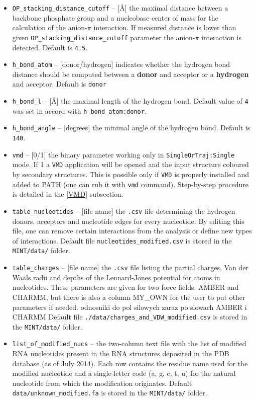 \documentclass[12pt]{article}
\begin{document}
\begin{itemize}
\item \texttt{OP\_stacking\_distance\_cutoff} -- [\AA]  the maximal distance between a backbone phosphate group and a nucleobase center of mass for the calculation of the anion-$\pi$ interaction. If measured distance is lower than given \texttt{OP\_stacking\_distance\_cutoff} parameter the anion-$\pi$ interaction is detected. Default is \texttt{4.5}.
\item \texttt{h\_bond\_atom} -- [donor/hydrogen] indicates whether the hydrogen bond distance should be computed between a \textbf{donor} and acceptor or a \textbf{hydrogen} and acceptor. Default is \texttt{donor} 
\item \texttt{h\_bond\_l} -- [\AA] the maximal length  of the hydrogen bond. Default value of {\tt 4} was set in accord with \texttt{h\_bond\_atom:donor}.
\item \texttt{h\_bond\_angle}  -- [degrees] the minimal angle of the hydrogen bond. Default is {\tt 140}.
\item {\tt vmd} -- [0/1] the binary parameter working only in {\tt SingleOrTraj:Single} mode. If 1 a {\tt VMD} application will be opened and the input structure coloured by secondary structures. This is possible only if {\tt VMD} is properly installed and added to PATH (one can rub it with {\tt vmd} command). Step-by-step procedure is detailed in the \ref{VMD} subsection.
\item \texttt{table\_nucleotides} -- [file name] the {\tt .csv} file determining the hydrogen donors, acceptors and nucleotide edges for every nucleotide. By editing this file, one can remove certain interactions from the analysis or define new types of interactions. Default file \texttt{nucleotides\_modified.csv} is stored in the \texttt{MINT/data/} folder.
\item \texttt{table\_charges}  -- [file name] the \texttt{.csv} file listing the partial charges, Van der Waals radii and depths of the Lennard-Jones potential for atoms in nucleotides. These parameters are given for two force fields: AMBER and CHARMM, but there is also a column MY\_OWN for the user to put other parameters if needed. {\color{red} odnosniki do pol silowych zaraz po slowach AMBER i CHARMM}
Default file \texttt{./data/charges\_and\_VDW\_modified.csv} is stored in the \texttt{MINT/data/} folder.
\item \texttt{list\_of\_modified\_nucs} -- the two-column text file with the list of modified RNA nucleotides present in the RNA structures deposited in the PDB database (as of July 2014). Each row contains the residue name used for the modified nucleotide and a single-letter code (a, g, c, t, u) for the natural nucleotide from which the modification originates. Default \texttt{data/unknown\_modified.fa} is stored in the \texttt{MINT/data/} folder.

\end{itemize}
\end{document}
